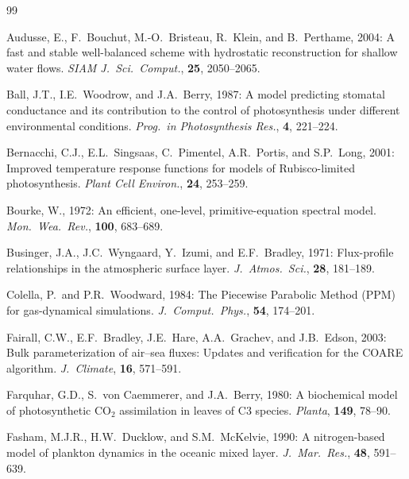 \documentclass[11pt,a4paper]{article}
\begin{document}
\begin{thebibliography}{99}

Audusse, E., F.~Bouchut, M.-O.~Bristeau, R.~Klein, and B.~Perthame, 2004:
A fast and stable well-balanced scheme with hydrostatic reconstruction for
shallow water flows.
\textit{SIAM J.\ Sci.\ Comput.}, \textbf{25}, 2050--2065.

Ball, J.T., I.E.~Woodrow, and J.A.~Berry, 1987:
A model predicting stomatal conductance and its contribution to the control
of photosynthesis under different environmental conditions.
\textit{Prog.\ in Photosynthesis Res.}, \textbf{4}, 221--224.

Bernacchi, C.J., E.L.~Singsaas, C.~Pimentel, A.R.~Portis, and S.P.~Long, 2001:
Improved temperature response functions for models of Rubisco-limited
photosynthesis.
\textit{Plant Cell Environ.}, \textbf{24}, 253--259.

Bourke, W., 1972:
An efficient, one-level, primitive-equation spectral model.
\textit{Mon.\ Wea.\ Rev.}, \textbf{100}, 683--689.

Businger, J.A., J.C.~Wyngaard, Y.~Izumi, and E.F.~Bradley, 1971:
Flux-profile relationships in the atmospheric surface layer.
\textit{J.\ Atmos.\ Sci.}, \textbf{28}, 181--189.

Colella, P.\ and P.R.~Woodward, 1984:
The Piecewise Parabolic Method (PPM) for gas-dynamical simulations.
\textit{J.\ Comput.\ Phys.}, \textbf{54}, 174--201.

Fairall, C.W., E.F.~Bradley, J.E.~Hare, A.A.~Grachev, and J.B.~Edson, 2003:
Bulk parameterization of air--sea fluxes: Updates and verification for the
COARE algorithm.
\textit{J.\ Climate}, \textbf{16}, 571--591.

Farquhar, G.D., S.~von Caemmerer, and J.A.~Berry, 1980:
A biochemical model of photosynthetic CO$_2$ assimilation in leaves of
C3 species.
\textit{Planta}, \textbf{149}, 78--90.

Fasham, M.J.R., H.W.~Ducklow, and S.M.~McKelvie, 1990:
A nitrogen-based model of plankton dynamics in the oceanic mixed layer.
\textit{J.\ Mar.\ Res.}, \textbf{48}, 591--639.


\end{thebibliography}
\end{document}
